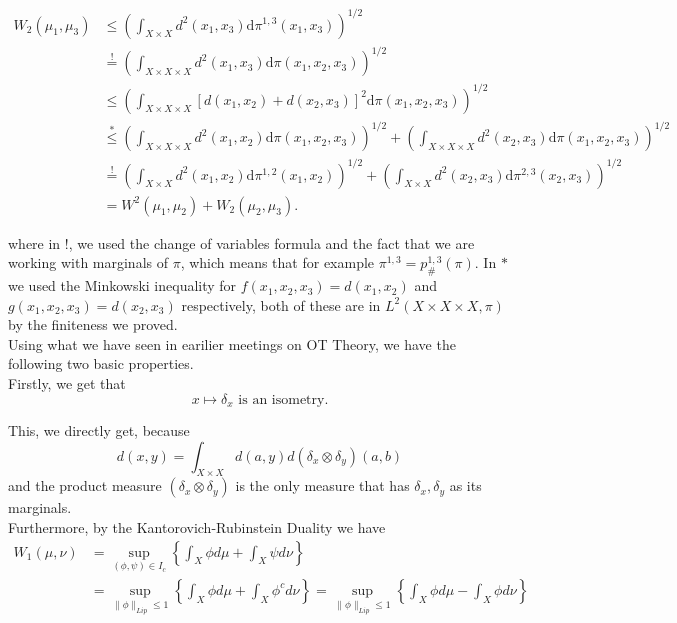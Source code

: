 \documentclass[15pt]{article}
\begin{document}
\begin{align*}W_2(\mu_1,\mu_3)
  &\leq\left(\int_{X\times X}d^2(x_1,x_3)\mathrm{d}\pi^{1,3}(x_1,x_3)\right)^{1/2}
  \\&\overset{!}{=}\left(\int_{X\times X\times X}d^2(x_1,x_3)\mathrm{d}\pi(x_1,x_2,x_3)\right)^{1/2}
  \\&\leq \left(\int_{ X\times X\times X}\left[d(x_1,x_2)+d(x_2,x_3)\right]^2\mathrm{d}\pi(x_1,x_2,x_3)\right)^{1/2}
  \\&\overset{*}{\leq}\left(\int_{X\times X \times X}d^2(x_1,x_2)\mathrm{d}\pi(x_1,x_2,x_3)\right)^{1/2}+\left(\int_{X\times X\times X}d^2(x_2,x_3)\mathrm{d}\pi(x_1,x_2,x_3)\right)^{1/2}
  \\&\overset{!}{=}\left(\int_{X\times X}d^2(x_1,x_2)\mathrm{d}\pi^{1,2}(x_1,x_2)\right)^{1/2}+\left(\int_{X\times X}d^2(x_2,x_3)\mathrm{d}\pi^{2,3}(x_2,x_3)\right)^{1/2}
  \\&=W^2(\mu_1,\mu_2)+W_2(\mu_2,\mu_3).
\end{align*}

where in !, we used the change of variables formula and the fact that we are working with marginals of $\pi$, which means that for example $\pi^{1,3} = p^{1,3}_{\#}(\pi)$. 
In $*$ we used the Minkowski inequality for $f(x_1,x_2,x_3) = d(x_1,x_2)$ and $g(x_1,x_2,x_3) = d(x_2,x_3)$ respectively, both of these are in $L^2(X \times X \times X,\pi)$ by the finiteness we proved. \\


Using what we have seen in earilier meetings on OT Theory, we have the following two basic properties. \\
Firstly, we get that $$x \mapsto \delta_x \text{ is an isometry.}$$ 

This, we directly get, because $$d(x,y) = \int_{X \times X} d(a,y) d(\delta_x \otimes \delta_y)(a,b)$$ and the product measure $(\delta_x \otimes \delta_y)$ is the only measure that has $\delta_x,\delta_y$ as its marginals. \\

Furthermore, by the Kantorovich-Rubinstein Duality we have \begin{align*} W_1(\mu,\nu) &= \sup_{(\phi,\psi) \in I_c} \left\{ \int_X \phi d\mu + \int_X \psi d\nu \right\} \\ &= \sup_{\|\phi\|_{Lip} \leq 1} \left\{\int_X \phi d\mu + \int_X \phi^c d\nu  \right\} 
   = \sup_{\|\phi\|_{Lip} \leq 1} \left\{\int_X \phi d\mu - \int_X \phi d\nu  \right\} \end{align*}
\end{document}
